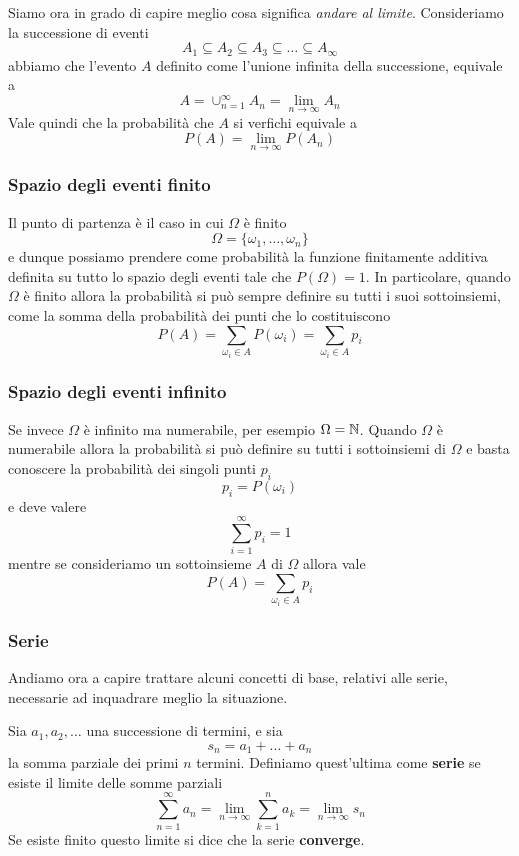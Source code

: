 Siamo ora in grado di capire meglio cosa significa \emph{andare al limite}. Consideriamo la successione di
eventi
\[ A_1 \subseteq A_2 \subseteq A_3 \subseteq \dots \subseteq A_\infty \]
abbiamo che l'evento $A$ definito come l'unione infinita della successione, equivale a
\[ A = \cup_{n=1}^\infty A_n = \lim_{n \to \infty} A_n \]
Vale quindi che la probabilità che $A$ si verfichi equivale a
\[ P(A) = \lim_{n \to \infty} P(A_n) \]

\subsubsection{Spazio degli eventi finito}
Il punto di partenza è il caso in cui $\Omega$ è finito
\[ \Omega = \{ \omega_1, \dots, \omega_n \} \]
e dunque possiamo prendere come probabilità la funzione finitamente additiva definita su tutto lo spazio
degli eventi tale che $P(\Omega) = 1$. In particolare, quando $\Omega$ è finito allora la probabilità si
può sempre definire su tutti i suoi sottoinsiemi, come la somma della probabilità dei punti che lo
costituiscono
\[ P(A) = \sum_{\omega_i \in A} P(\omega_i) = \sum_{\omega_i \in A} p_i \]

\subsubsection{Spazio degli eventi infinito}
Se invece $\Omega$ è infinito ma numerabile, per esempio $\Omega = \mathbb{N}$. Quando $\Omega$ è numerabile allora
la probabilità si può definire su tutti i sottoinsiemi di $\Omega$ e basta conoscere la probabilità dei
singoli punti $p_i$
\[ p_i = P(\omega_i) \]
e deve valere
\[ \sum_{i=1}^\infty p_i = 1 \]
mentre se consideriamo un sottoinsieme $A$ di $\Omega$ allora vale
\[ P(A) = \sum_{\omega_i \in A} p_i \]

\subsubsection{Serie}
Andiamo ora a capire trattare alcuni concetti di base, relativi alle serie, necessarie ad inquadrare meglio
la situazione.

\begin{definition}
	Sia $a_1, a_2, \dots$ una successione di termini, e sia
	\[ s_n = a_1 + \dots + a_n \]
	la somma parziale dei primi $n$ termini. Definiamo quest'ultima come \textbf{serie} se esiste il limite
	delle somme parziali
	\[ \sum_{n=1}^\infty a_n = \lim_{n \to \infty} \sum_{k=1}^n a_k = \lim_{n \to \infty} s_n \]
	Se esiste finito questo limite si dice che la serie \textbf{converge}.
\end{definition}

